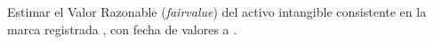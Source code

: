 Estimar el Valor Razonable (\textit{\gls{fairvalue}}) del activo intangible consistente en la marca registrada \textcolor{principal}{\marca}, con fecha de valores a \textcolor{principal}{\fechaValores}.